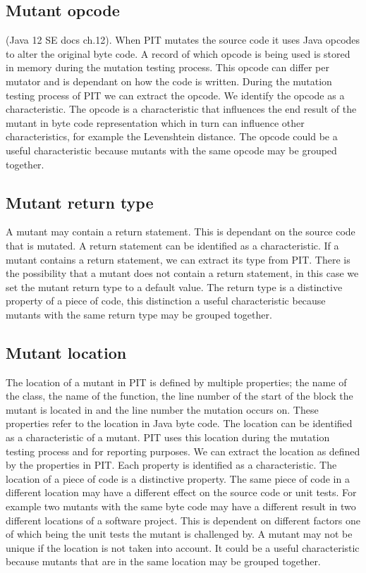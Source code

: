 \documentclass[../../main]{subfiles}
\begin{document}
\subsection{Mutant opcode}
 (Java 12 SE docs ch.12).
When PIT mutates the source code it uses Java opcodes to alter the original byte code. 
A record of which opcode is being used is stored in memory during the mutation testing process. 
This opcode can differ per mutator and is dependant on how the code is written.
During the mutation testing process of PIT we can extract the opcode.
We identify the opcode as a characteristic.
The opcode is a characteristic that influences the end result of the mutant in byte code representation which in turn can influence other characteristics, for example the Levenshtein distance.
The opcode could be a useful characteristic because mutants with the same opcode may be grouped together.

\subsection{Mutant return type}
A mutant may contain a return statement. 
This is dependant on the source code that is mutated.
A return statement can be identified as a characteristic.
If a mutant contains a return statement, we can extract its type from PIT.
There is the possibility that a mutant does not contain a return statement, in this case we set the mutant return type to a default value.
The return type is a distinctive property of a piece of code, this distinction a useful characteristic because mutants with the same return type may be grouped together.


\subsection{Mutant location}\label{ch:characteristics_location}
The location of a mutant in PIT is defined by multiple properties;
the name of the class, the name of the function, the line number of the start of the block the mutant is located in and the line number the mutation occurs on.
These properties refer to the location in Java byte code.
The location can be identified as a characteristic of a mutant.
PIT uses this location during the mutation testing process and for reporting purposes.
We can extract the location as defined by the properties in PIT.
Each property is identified as a characteristic.
The location of a piece of code is a distinctive property. 
The same piece of code in a different location may have a different effect on the source code or unit tests.
For example two mutants with the same byte code may have a different result in two different locations of a software project. 
This is dependent on different factors one of which being the unit tests the mutant is challenged by.
A mutant may not be unique if the location is not taken into account.
It could be a useful characteristic because mutants that are in the same location may be grouped together.
\end{document}
